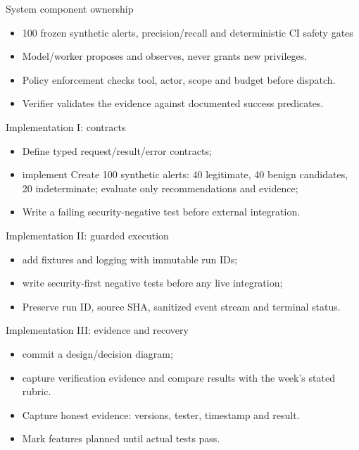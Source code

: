 \documentclass[aspectratio=169,10pt]{beamer}
\begin{document}
\begin{frame}{System component ownership}
\small
\begin{itemize}
\item 100 frozen synthetic alerts, precision/recall and deterministic CI safety gates
\item Model/worker proposes and observes, never grants new privileges.
\item Policy enforcement checks tool, actor, scope and budget before dispatch.
\item Verifier validates the evidence against documented success predicates.
\end{itemize}

\end{frame}

\begin{frame}{Implementation I: contracts}
\small
\begin{itemize}
\item Define typed request/result/error contracts;
\item implement Create 100 synthetic alerts: 40 legitimate, 40 benign candidates, 20 indeterminate; evaluate only recommendations and evidence;
\item Write a failing security-negative test before external integration.
\end{itemize}

\end{frame}

\begin{frame}{Implementation II: guarded execution}
\small
\begin{itemize}
\item add fixtures and logging with immutable run IDs;
\item write security-first negative tests before any live integration;
\item Preserve run ID, source SHA, sanitized event stream and terminal status.
\end{itemize}

\end{frame}

\begin{frame}{Implementation III: evidence and recovery}
\small
\begin{itemize}
\item commit a design/decision diagram;
\item capture verification evidence and compare results with the week's stated rubric.
\item Capture honest evidence: versions, tester, timestamp and result.
\item Mark features planned until actual tests pass.
\end{itemize}

\end{frame}
\end{document}

